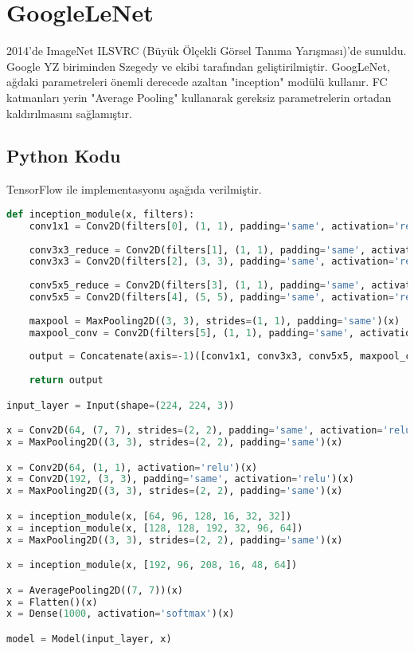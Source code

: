 \section{GoogleLeNet}
2014'de ImageNet ILSVRC (Büyük Ölçekli Görsel Tanıma Yarışması)'de sunuldu. Google YZ biriminden Szegedy ve ekibi tarafından geliştirilmiştir. GoogLeNet, ağdaki parametreleri önemli derecede azaltan "inception" modülü kullanır. FC katmanları yerin "Average Pooling" kullanarak gereksiz parametrelerin ortadan kaldırılmasını sağlamıştır.

\subsection{Python Kodu}

TensorFlow ile implementasyonu aşağıda verilmiştir.

\begin{lstlisting}[language=Python]
def inception_module(x, filters):
    conv1x1 = Conv2D(filters[0], (1, 1), padding='same', activation='relu')(x)
    
    conv3x3_reduce = Conv2D(filters[1], (1, 1), padding='same', activation='relu')(x)
    conv3x3 = Conv2D(filters[2], (3, 3), padding='same', activation='relu')(conv3x3_reduce)
    
    conv5x5_reduce = Conv2D(filters[3], (1, 1), padding='same', activation='relu')(x)
    conv5x5 = Conv2D(filters[4], (5, 5), padding='same', activation='relu')(conv5x5_reduce)
    
    maxpool = MaxPooling2D((3, 3), strides=(1, 1), padding='same')(x)
    maxpool_conv = Conv2D(filters[5], (1, 1), padding='same', activation='relu')(maxpool)
    
    output = Concatenate(axis=-1)([conv1x1, conv3x3, conv5x5, maxpool_conv])
    
    return output

input_layer = Input(shape=(224, 224, 3))

x = Conv2D(64, (7, 7), strides=(2, 2), padding='same', activation='relu')(input_layer)
x = MaxPooling2D((3, 3), strides=(2, 2), padding='same')(x)

x = Conv2D(64, (1, 1), activation='relu')(x)
x = Conv2D(192, (3, 3), padding='same', activation='relu')(x)
x = MaxPooling2D((3, 3), strides=(2, 2), padding='same')(x)

x = inception_module(x, [64, 96, 128, 16, 32, 32])
x = inception_module(x, [128, 128, 192, 32, 96, 64])
x = MaxPooling2D((3, 3), strides=(2, 2), padding='same')(x)

x = inception_module(x, [192, 96, 208, 16, 48, 64])

x = AveragePooling2D((7, 7))(x)
x = Flatten()(x)
x = Dense(1000, activation='softmax')(x) 

model = Model(input_layer, x)
\end{lstlisting}

\newpage